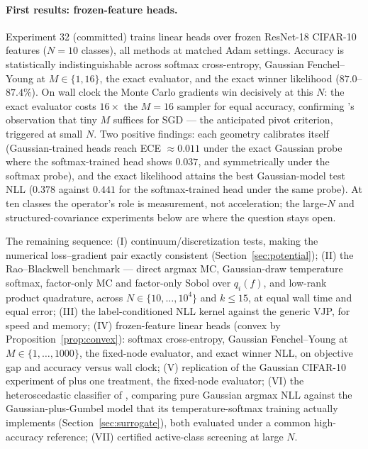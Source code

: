 \documentclass[11pt]{article}
\theoremstyle{remark}
\begin{document}
\paragraph{First results: frozen-feature heads.} Experiment 32
(committed) trains linear heads over frozen ResNet-18 CIFAR-10 features
($N = 10$ classes), all methods at matched Adam settings. Accuracy is
statistically indistinguishable across softmax cross-entropy, Gaussian
Fenchel--Young at $M \in \{1, 16\}$, the exact evaluator, and the exact
winner likelihood ($87.0$--$87.4\%$). On wall clock the Monte Carlo
gradients win decisively at this $N$: the exact evaluator costs
$16\times$ the $M{=}16$ sampler for equal accuracy, confirming
\citet{berthet2020}'s observation that tiny $M$ suffices for SGD ---
the anticipated pivot criterion, triggered at small $N$. Two positive
findings: each geometry calibrates itself (Gaussian-trained heads reach
ECE $\approx 0.011$ under the exact Gaussian probe where the
softmax-trained head shows $0.037$, and symmetrically under the softmax
probe), and the exact likelihood attains the best Gaussian-model test
NLL ($0.378$ against $0.441$ for the softmax-trained head under the
same probe). At ten classes the operator's role is measurement, not
acceleration; the large-$N$ and structured-covariance experiments below
are where the question stays open.

The remaining sequence: (I) continuum/discretization tests, making the
numerical loss--gradient pair exactly consistent
(Section~\ref{sec:potential}); (II) the Rao--Blackwell benchmark ---
direct argmax MC, Gaussian-draw temperature softmax, factor-only MC and
factor-only Sobol over $q_i(f)$, and low-rank product quadrature,
across $N \in \{10, \dots, 10^4\}$ and $k \le 15$, at equal wall time
and equal error; (III) the label-conditioned NLL kernel against the
generic VJP, for speed and memory; (IV) frozen-feature linear heads
(convex by Proposition~\ref{prop:convex}): softmax cross-entropy,
Gaussian Fenchel--Young at $M \in \{1, \dots, 1000\}$, the fixed-node
evaluator, and exact winner NLL, on objective gap and accuracy versus
wall clock; (V) replication of the Gaussian CIFAR-10 experiment of
\citet{berthet2020} plus one treatment, the fixed-node evaluator; (VI)
the heteroscedastic classifier of \citet{collier2021}, comparing pure
Gaussian argmax NLL against the Gaussian-plus-Gumbel model that its
temperature-softmax training actually implements
(Section~\ref{sec:surrogate}), both evaluated under a common
high-accuracy reference; (VII) certified active-class screening at
large $N$.
\end{document}
